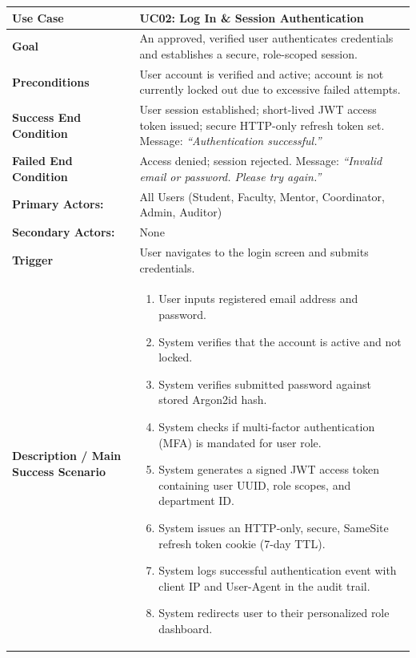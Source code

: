\begin{table}[H]
\centering
\small
\begin{tabularx}{\textwidth}{|l|X|}
\hline
\rowcolor{lightgray!40} \textbf{Use Case} & \textbf{UC02: Log In \& Session Authentication} \\ \hline
\textbf{Goal} & An approved, verified user authenticates credentials and establishes a secure, role-scoped session. \\ \hline
\textbf{Preconditions} & User account is verified and active; account is not currently locked out due to excessive failed attempts. \\ \hline
\textbf{Success End Condition} & User session established; short-lived JWT access token issued; secure HTTP-only refresh token set. Message: \textit{``Authentication successful.''} \\ \hline
\textbf{Failed End Condition} & Access denied; session rejected. Message: \textit{``Invalid email or password. Please try again.''} \\ \hline
\textbf{Primary Actors:} & All Users (Student, Faculty, Mentor, Coordinator, Admin, Auditor) \\
\textbf{Secondary Actors:} & None \\ \hline
\textbf{Trigger} & User navigates to the login screen and submits credentials. \\ \hline
\textbf{Description / Main Success Scenario} &
\begin{enumerate}[leftmargin=*]
    \item User inputs registered email address and password.
    \item System verifies that the account is active and not locked.
    \item System verifies submitted password against stored Argon2id hash.
    \item System checks if multi-factor authentication (MFA) is mandated for user role.
    \item System generates a signed JWT access token containing user UUID, role scopes, and department ID.
    \item System issues an HTTP-only, secure, SameSite refresh token cookie (7-day TTL).
    \item System logs successful authentication event with client IP and User-Agent in the audit trail.
    \item System redirects user to their personalized role dashboard.
\end{enumerate} \\ \hline

\end{tabularx}
\end{table}
